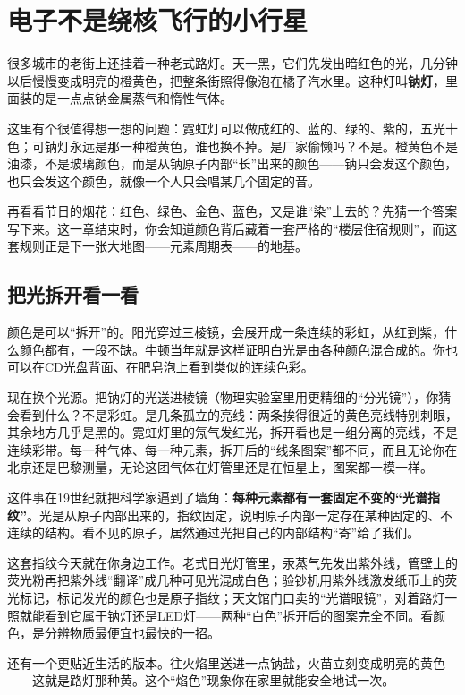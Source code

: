 \chapter{电子不是绕核飞行的小行星}

\begin{kaichang}
很多城市的老街上还挂着一种老式路灯。天一黑，它们先发出暗红色的光，几分钟以后慢慢变成明亮的橙黄色，把整条街照得像泡在橘子汽水里。这种灯叫\textbf{钠灯}，里面装的是一点点钠金属蒸气和惰性气体。

这里有个很值得想一想的问题：霓虹灯可以做成红的、蓝的、绿的、紫的，五光十色；可钠灯永远是那一种橙黄色，谁也换不掉。是厂家偷懒吗？不是。橙黄色不是油漆，不是玻璃颜色，而是从钠原子内部“长”出来的颜色——钠只会发这个颜色，也只会发这个颜色，就像一个人只会唱某几个固定的音。

再看看节日的烟花：红色、绿色、金色、蓝色，又是谁“染”上去的？先猜一个答案写下来。这一章结束时，你会知道颜色背后藏着一套严格的“楼层住宿规则”，而这套规则正是下一张大地图——元素周期表——的地基。
\end{kaichang}

\section{把光拆开看一看}

颜色是可以“拆开”的。阳光穿过三棱镜，会展开成一条连续的彩虹，从红到紫，什么颜色都有，一段不缺。牛顿当年就是这样证明白光是由各种颜色混合成的。你也可以在CD光盘背面、在肥皂泡上看到类似的连续色彩。

现在换个光源。把钠灯的光送进棱镜（物理实验室里用更精细的“分光镜”），你猜会看到什么？不是彩虹。是几条孤立的亮线：两条挨得很近的黄色亮线特别刺眼，其余地方几乎是黑的。霓虹灯里的氖气发红光，拆开看也是一组分离的亮线，不是连续彩带。每一种气体、每一种元素，拆开后的“线条图案”都不同，而且无论你在北京还是巴黎测量，无论这团气体在灯管里还是在恒星上，图案都一模一样。

这件事在19世纪就把科学家逼到了墙角：\textbf{每种元素都有一套固定不变的“光谱指纹”}。光是从原子内部出来的，指纹固定，说明原子内部一定存在某种固定的、不连续的结构。看不见的原子，居然通过光把自己的内部结构“寄”给了我们。

这套指纹今天就在你身边工作。老式日光灯管里，汞蒸气先发出紫外线，管壁上的荧光粉再把紫外线“翻译”成几种可见光混成白色；验钞机用紫外线激发纸币上的荧光标记，标记发光的颜色也是原子指纹；天文馆门口卖的“光谱眼镜”，对着路灯一照就能看到它属于钠灯还是LED灯——两种“白色”拆开后的图案完全不同。看颜色，是分辨物质最便宜也最快的一招。

还有一个更贴近生活的版本。往火焰里送进一点钠盐，火苗立刻变成明亮的黄色——这就是路灯那种黄。这个“焰色”现象你在家里就能安全地试一次。

